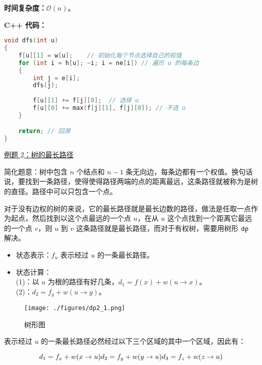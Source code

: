 \textbf{时间复杂度：}$\mathcal{O}(n)$。

\textbf{C++ 代码：}

\begin{lstlisting}[language=cpp]
void dfs(int u)
{
    f[u][1] = w[u];    // 初始化每个节点选择自己的权值
    for (int i = h[u]; ~i; i = ne[i]) // 遍历 u 的每条边
    {
        int j = e[i];
        dfs(j);
        
        f[u][1] += f[j][0];  // 选择 u
        f[u][0] += max(f[j][1], f[j][0]); // 不选 u
    }

    return; // 回溯
}

\end{lstlisting}

\href{https://www.luogu.com.cn/problem/SP1437}{例题 $2$：树的最长路径}

简化题意：树中包含 $n$ 个结点和 $n-1$ 条无向边，每条边都有一个权值。换句话说，要找到一条路径，使得使得路径两端的点的距离最远，这条路径就被称为是树的直径。路径中可以只包含一个点。

对于没有边权的树的来说，它的最长路径就是最长边数的路径，做法是任取一点作为起点，然后找到以这个点最远的一个点 $u$，在从 $u$ 这个点找到一个距离它最远的一个点 $v$，则 $u$ 到 $v$ 这条路径就是最长路径，而对于有权树，需要用树形 $\tt dp$ 解决。

\begin{itemize}
\item 状态表示：$f_u$ 表示经过 $u$ 的一条最长路径。
\end{itemize}

\begin{itemize}
\item 状态计算： \\
    (1)：以 $u$ 为根的路径有好几条，$d_1 = f(x) + w(u \to x)$。 \\
    (2)：$d_2 = f_y + w(u \to y)$。
\end{itemize}

\begin{figure}[ht]
\centering
\texttt{[image: ./figures/dp2\_1.png]}
\caption{树形图} \label{dp2_fig1}
\end{figure}

表示经过 $u$ 的一条最长路径必然经过以下三个区域的其中一个区域，因此有：

\begin{equation}
d_1 = f_x + w(x \to u) \\
d_2 = f_y + w(y \to u) \\
d_3 = f_z + w(z \to u) \\
\end{equation}

